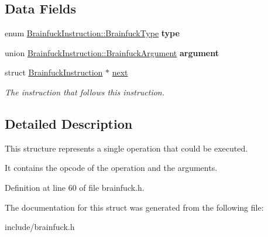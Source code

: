\subsection*{Data Fields}
\begin{DoxyCompactItemize}
\item 
\hypertarget{structBrainfuckInstruction_a36afb590d39c03c56d8887fef280e5f8}{}enum \hyperlink{group__ast_ga536105595916938ef76e66bb1cdf7b2b}{Brainfuck\+Instruction\+::\+Brainfuck\+Type} {\bfseries type}\label{structBrainfuckInstruction_a36afb590d39c03c56d8887fef280e5f8}

\item 
\hypertarget{structBrainfuckInstruction_a20bdad657a1486dd42fa39e0e046cfaa}{}union \hyperlink{unionBrainfuckInstruction_1_1BrainfuckArgument}{Brainfuck\+Instruction\+::\+Brainfuck\+Argument} {\bfseries argument}\label{structBrainfuckInstruction_a20bdad657a1486dd42fa39e0e046cfaa}

\item 
\hypertarget{structBrainfuckInstruction_aa5e6d702ae67d413976935ce4b893bbc}{}struct \hyperlink{structBrainfuckInstruction}{Brainfuck\+Instruction} $\ast$ \hyperlink{structBrainfuckInstruction_aa5e6d702ae67d413976935ce4b893bbc}{next}\label{structBrainfuckInstruction_aa5e6d702ae67d413976935ce4b893bbc}

\begin{DoxyCompactList}\small\item\em The instruction that follows this instruction. \end{DoxyCompactList}\end{DoxyCompactItemize}


\subsection{Detailed Description}
This structure represents a single operation that could be executed. 

It contains the opcode of the operation and the arguments. 

Definition at line 60 of file brainfuck.\+h.



The documentation for this struct was generated from the following file\+:\begin{DoxyCompactItemize}
\item 
include/brainfuck.\+h\end{DoxyCompactItemize}
